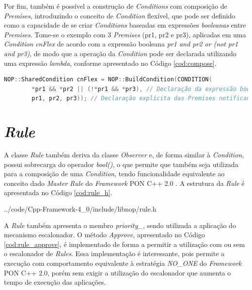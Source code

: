 \FloatBarrier

Por fim, também é possível a construção de \textit{Conditions} com composição de
\textit{Premises}, introduzindo o conceito de \textit{Condition} flexível, que
pode ser definido como a capacidade de se criar \textit{Conditions} baseadas em
expressões \textit{booleanas} entre \textit{Premises}. Tome-se o exemplo com 3
\textit{Premises} (pr1, pr2 e pr3), aplicadas em uma \textit{Condition}
\textit{cnFlex} de acordo com a expressão booleana \textit{pr1 and pr2 or (not pr1 and
pr3)}, de modo que a operação da \textit{Condition} pode ser declarada
utilizando uma expressão \textit{lambda}, conforme apresentado no Código
\ref{cod:compose}.

\begin{lstlisting}[language=C++, float=htb,
caption = {\textit{Condition} flexível no \textit{Framework} PON C++ 4.0},
source = {Autoria própria},
label ={cod:compose}]
NOP::SharedCondition cnFlex = NOP::BuildCondition(CONDITION(
        *pr1 && *pr2 || (!*pr1 && *pr3), // Declaração da expressão booleana
        pr1, pr2, pr3)); // Declaração explícita das Premises notificantes
\end{lstlisting}

\section{\textit{Rule}}

A classe \textit{Rule} também deriva da classe \textit{Observer} e, de forma
similar à \textit{Condition}, possui sobrecarga do operador \textit{bool()}, o
que permite que também seja utilizada para a composição de uma
\textit{Condition}, tendo funcionalidade equivalente ao conceito dado
\textit{Master Rule} do \textit{Framework} PON C++ 2.0 \cite{msc_Ronszcka_2012}.
A estrutura da \textit{Rule} é apresentada no Código \ref{cod:rule_h}.


            {../code/Cpp-Framework-4_0/include/libnop/rule.h}

A \textit{Rule} também apresenta o membro \textit{priority\_}, sendo utilizada a
aplicação do mecanismo escalonador. O método \textit{Approve}, apresentado no
Código \ref{cod:rule_approve}, é implementado de forma a permitir a utilização
com ou sem o escalonador de \textit{Rules}. Essa implementação é interessante,
pois permite a execução com comportamento equivalente à estratégia
\textit{NO\_ONE} do \textit{Framework} PON C++ 2.0, porém sem exigir a
utilização do escalonador que aumenta o tempo de execução das aplicações.


